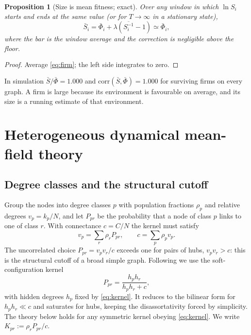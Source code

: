 \documentclass[11pt]{article}
\newcommand{\bPhi}{\bar\Phi}
\newtheorem{proposition}{Proposition}
\begin{document}
\begin{proposition}[Size is mean fitness; exact]\label{prop:size}
Over any window in which $\ln S_i$ starts and ends at the same value (or for $T\to\infty$ in a
stationary state),
\begin{equation}
  \bar S_i=\bPhi_i+\lambda\left(\overline{S_i^{-1}}-1\right)\simeq\bPhi_i ,
  \label{eq:sizefitness}
\end{equation}
where the bar is the window average and the correction is negligible above the floor.
\end{proposition}
\begin{proof}
Average \eqref{eq:firm}; the left side integrates to zero.
\end{proof}
In simulation $\bar S/\bPhi=1.000$ and $\mathrm{corr}(\bar S,\bPhi)=1.000$ for surviving firms on
every graph.  A firm is large because its environment is favourable on average, and its size is a
running estimate of that environment.

\section{Heterogeneous dynamical mean-field theory}
\label{sec:hdmft}

\subsection{Degree classes and the structural cutoff}

Group the nodes into degree classes $p$ with population fractions $\rho_p$ and relative degrees
$v_p=k_p/N$, and let $P_{pr}$ be the probability that a node of class $p$ links to one of class
$r$.  With connectance $c=C/N$ the kernel must satisfy
\begin{equation}
  v_p=\sum_r\rho_rP_{pr},\qquad c=\sum_p\rho_pv_p .
  \label{eq:kernel}
\end{equation}
The uncorrelated choice $P_{pr}=v_pv_r/c$ exceeds one for pairs of hubs, $v_pv_r>c$: this is
the structural cutoff of a broad simple graph.  Following \citet{patil2026} we use the
soft-configuration kernel
\begin{equation}
  P_{pr}=\frac{h_ph_r}{h_ph_r+c},
  \label{eq:scm}
\end{equation}
with hidden degrees $h_p$ fixed by \eqref{eq:kernel}.  It reduces to the bilinear form for
$h_ph_r\ll c$ and saturates for hubs, keeping the disassortativity forced by simplicity.  The
theory below holds for any symmetric kernel obeying \eqref{eq:kernel}.  We write
$K_{pr}:=\rho_rP_{pr}/c$.
\end{document}
